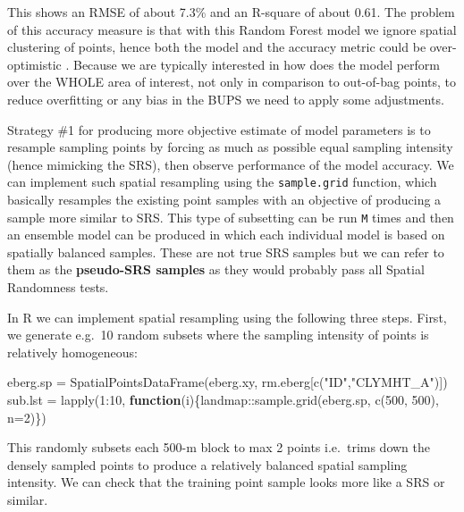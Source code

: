 \documentclass[
  graybox,natbib,nospthms]{svmono}
\newenvironment{Shaded}{\begin{snugshade}}{\end{snugshade}}
\newcommand{\AttributeTok}[1]{\textcolor[rgb]{0.61,0.61,0.61}{#1}}
\newcommand{\ControlFlowTok}[1]{\textcolor[rgb]{0.27,0.27,0.27}{\textbf{#1}}}
\newcommand{\DecValTok}[1]{\textcolor[rgb]{0.06,0.06,0.06}{#1}}
\newcommand{\FunctionTok}[1]{\textcolor[rgb]{0,0,0}{#1}}
\newcommand{\NormalTok}[1]{#1}
\newcommand{\OtherTok}[1]{\textcolor[rgb]{0.37,0.37,0.37}{#1}}
\newcommand{\SpecialCharTok}[1]{\textcolor[rgb]{0,0,0}{#1}}
\newcommand{\StringTok}[1]{\textcolor[rgb]{0.5,0.5,0.5}{#1}}
\begin{document}
This shows an RMSE of about 7.3\% and an R-square of about 0.61. The problem of this
accuracy measure is that with this Random Forest model we ignore spatial clustering
of points, hence both the model and the accuracy metric could be over-optimistic \citep{roberts2017cross, meyer2018improving}. Because we are typically interested in
how does the model perform over the WHOLE area of interest, not only in comparison
to out-of-bag points, to reduce overfitting or any bias in the BUPS we need to
apply some adjustments.

Strategy \#1 for producing more objective estimate of model parameters is to
resample sampling points by forcing as much as possible equal sampling intensity
(hence mimicking the SRS), then observe performance of the model accuracy.
We can implement such spatial resampling using the \texttt{sample.grid} function,
which basically resamples the existing point samples with an objective of producing
a sample more similar to SRS. This type of subsetting can be run \texttt{M} times and
then an ensemble model can be produced in which each individual model is based
on spatially balanced samples. These are not true SRS samples but we can refer
to them as the \textbf{pseudo-SRS samples} as they would probably pass all Spatial
Randomness tests.

In R we can implement spatial resampling using the following three steps. First,
we generate e.g.~10 random subsets where the sampling intensity of points is
relatively homogeneous:

\begin{Shaded}
\begin{Highlighting}[]
\NormalTok{eberg.sp }\OtherTok{=} \FunctionTok{SpatialPointsDataFrame}\NormalTok{(eberg.xy, rm.eberg[}\FunctionTok{c}\NormalTok{(}\StringTok{"ID"}\NormalTok{,}\StringTok{"CLYMHT\_A"}\NormalTok{)])}
\NormalTok{sub.lst }\OtherTok{=} \FunctionTok{lapply}\NormalTok{(}\DecValTok{1}\SpecialCharTok{:}\DecValTok{10}\NormalTok{, }\ControlFlowTok{function}\NormalTok{(i)\{landmap}\SpecialCharTok{::}\FunctionTok{sample.grid}\NormalTok{(eberg.sp, }\FunctionTok{c}\NormalTok{(}\DecValTok{500}\NormalTok{, }\DecValTok{500}\NormalTok{), }\AttributeTok{n=}\DecValTok{2}\NormalTok{)\})}
\end{Highlighting}
\end{Shaded}

This randomly subsets each 500-m block to max 2 points i.e.~trims down the densely
sampled points to produce a relatively balanced spatial sampling intensity. We can
check that the training point sample looks more like a SRS or similar.
\end{document}
